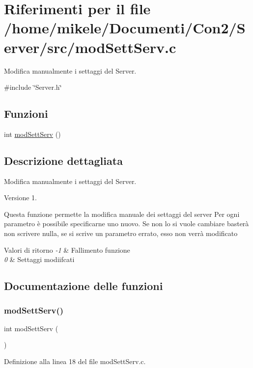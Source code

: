 \hypertarget{a00035}{}\section{Riferimenti per il file /home/mikele/\+Documenti/\+Con2/\+Server/src/mod\+Sett\+Serv.c}
\label{a00035}


Modifica manualmente i settaggi del Server.  


{\ttfamily \#include \char`\"{}Server.\+h\char`\"{}}\newline
\subsection*{Funzioni}
\begin{DoxyCompactItemize}
\item 
int \mbox{\hyperlink{a00035_acd1f4ad00301185734118d32a0ed391b}{mod\+Sett\+Serv}} ()
\end{DoxyCompactItemize}


\subsection{Descrizione dettagliata}
Modifica manualmente i settaggi del Server. 

\begin{DoxyVersion}{Versione}
1.
\end{DoxyVersion}
Questa funzione permette la modifica manuale dei settaggi del server Per ogni parametro è possibile specificarne uno nuovo. Se non lo si vuole cambiare basterà non scrivere nulla, se si scrive un parametro errato, esso non verrà modificato


\begin{DoxyRetVals}{Valori di ritorno}
{\em -\/1} & Fallimento funzione \\
\hline
{\em 0} & Settaggi modiifcati \\
\hline
\end{DoxyRetVals}


\subsection{Documentazione delle funzioni}
\mbox{\label{a00035_acd1f4ad00301185734118d32a0ed391b}} 
\subsubsection{\texorpdfstring{modSettServ()}{modSettServ()}}
{\footnotesize\ttfamily int mod\+Sett\+Serv (\begin{DoxyParamCaption}{ }\end{DoxyParamCaption})}



Definizione alla linea 18 del file mod\+Sett\+Serv.\+c.

